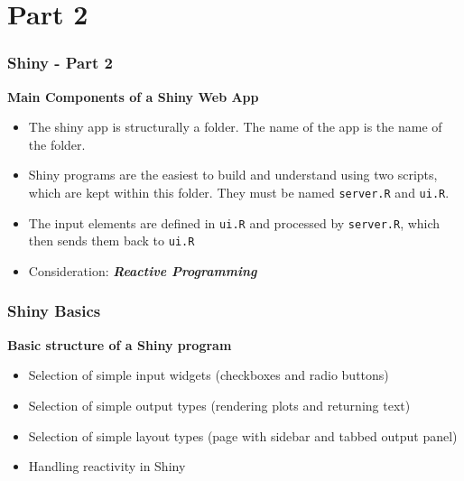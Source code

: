 \documentclass{beamer}
\begin{document}
\section{Part 2}
\begin{frame}
\frametitle{Shiny - Part 2}
\Large
\textbf{Main Components of a Shiny Web App} 
\begin{itemize}
\item The shiny app is structurally a folder. The name of the app is the name of the folder.
\item  Shiny programs are the easiest to build and
understand using two scripts, which are kept within this folder. They must be
named \texttt{server.R} and \texttt{ui.R}.
\item 
The input elements are defined in
\texttt{ui.R} and processed by \texttt{server.R}, which then sends them back to \texttt{ui.R}
\item Consideration: \textbf{\textit{Reactive Programming}}
\end{itemize}


\end{frame}

\begin{frame}
\frametitle{Shiny Basics}
\Large
\vspace{-0.5cm}
\textbf{Basic structure of a Shiny program}
\begin{itemize}
\item  Selection of simple input widgets (checkboxes and radio buttons)
\item  Selection of simple output types (rendering plots and returning text)
\item  Selection of simple layout types (page with sidebar and tabbed output panel)
\item  Handling reactivity in Shiny
\end{itemize}
\end{frame}
\end{document}
